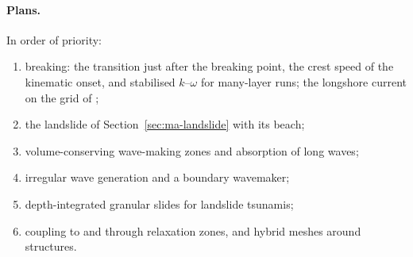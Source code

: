 \paragraph{Plans.} In order of priority:
\begin{enumerate}[nosep]
  \item breaking: the transition just after the breaking point, the crest
        speed of the kinematic onset, and stabilised $k$--$\omega$
        \citep{larsen2018} for many-layer runs; the longshore current on the
        grid of \citet{ma2012};
  \item the landslide of Section~\ref{sec:ma-landslide} with its beach;
  \item volume-conserving wave-making zones and absorption of long waves;
  \item irregular wave generation and a boundary wavemaker;
  \item depth-integrated granular slides for landslide tsunamis;
  \item coupling to  and  through relaxation
        zones, and hybrid meshes around structures.
\end{enumerate}
